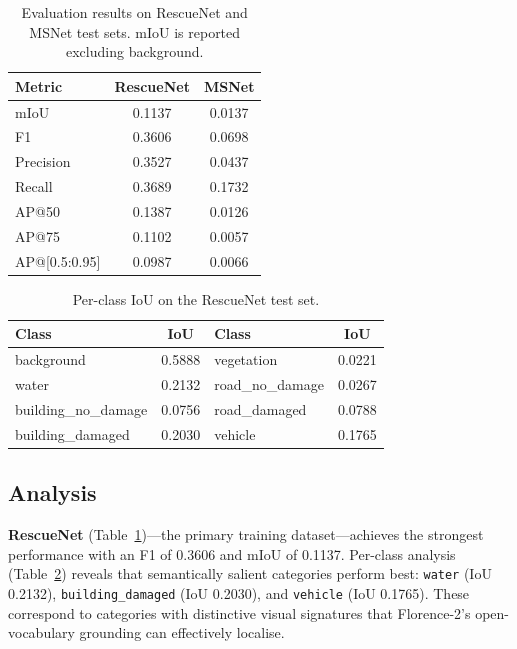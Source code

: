 \documentclass[10pt,a4paper,twocolumn]{article}
\begin{document}
\begin{table}[h]
\centering
\caption{Evaluation results on RescueNet and MSNet test sets. mIoU is reported excluding background.}
\label{tab:results}
\fontsize{8}{9.5}\selectfont
\begin{tabular}{lcc}
\toprule
\textbf{Metric} & \textbf{RescueNet} & \textbf{MSNet} \\
\midrule
mIoU              & 0.1137 & 0.0137 \\
F1                & 0.3606 & 0.0698 \\
Precision         & 0.3527 & 0.0437 \\
Recall            & 0.3689 & 0.1732 \\
AP@50             & 0.1387 & 0.0126 \\
AP@75             & 0.1102 & 0.0057 \\
AP@[0.5:0.95]     & 0.0987 & 0.0066 \\
\bottomrule
\end{tabular}
\end{table}

\begin{table}[h]
\centering
\caption{Per-class IoU on the RescueNet test set.}
\label{tab:perclass}
\fontsize{8}{9.5}\selectfont
\begin{tabular}{lclc}
\toprule
\textbf{Class} & \textbf{IoU} & \textbf{Class} & \textbf{IoU} \\
\midrule
background         & 0.5888 & vegetation      & 0.0221 \\
water              & 0.2132 & road\_no\_damage & 0.0267 \\
building\_no\_damage & 0.0756 & road\_damaged    & 0.0788 \\
building\_damaged   & 0.2030 & vehicle         & 0.1765 \\
\bottomrule
\end{tabular}
\end{table}

\subsection{Analysis}

\textbf{RescueNet} (Table~\ref{tab:results})---the primary training dataset---achieves the strongest performance with an F1 of 0.3606 and mIoU of 0.1137. Per-class analysis (Table~\ref{tab:perclass}) reveals that semantically salient categories perform best: \texttt{water} (IoU 0.2132), \texttt{building\_damaged} (IoU 0.2030), and \texttt{vehicle} (IoU 0.1765). These correspond to categories with distinctive visual signatures that Florence-2's open-vocabulary grounding can effectively localise.
\end{document}
